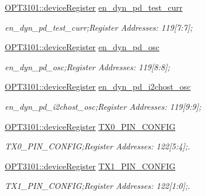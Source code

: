 \begin{DoxyCompactItemize}
\mbox{\hyperlink{class_o_p_t3101_1_1device_register}{O\+P\+T3101\+::device\+Register}} \mbox{\hyperlink{class_o_p_t3101_1_1registers_a1dd4f120fd54b75ee11b2749c9572fc7}{en\+\_\+dyn\+\_\+pd\+\_\+test\+\_\+curr}}
\begin{DoxyCompactList}\small\item\em en\+\_\+dyn\+\_\+pd\+\_\+test\+\_\+curr;Register Addresses\+: 119\mbox{[}7\+:7\mbox{]}; \end{DoxyCompactList}\item 
\mbox{\hyperlink{class_o_p_t3101_1_1device_register}{O\+P\+T3101\+::device\+Register}} \mbox{\hyperlink{class_o_p_t3101_1_1registers_a531bbd358fefe3feca48a12938b7ef11}{en\+\_\+dyn\+\_\+pd\+\_\+osc}}
\begin{DoxyCompactList}\small\item\em en\+\_\+dyn\+\_\+pd\+\_\+osc;Register Addresses\+: 119\mbox{[}8\+:8\mbox{]}; \end{DoxyCompactList}\item 
\mbox{\hyperlink{class_o_p_t3101_1_1device_register}{O\+P\+T3101\+::device\+Register}} \mbox{\hyperlink{class_o_p_t3101_1_1registers_ac3f0387e577070854f43aa27e5b86020}{en\+\_\+dyn\+\_\+pd\+\_\+i2chost\+\_\+osc}}
\begin{DoxyCompactList}\small\item\em en\+\_\+dyn\+\_\+pd\+\_\+i2chost\+\_\+osc;Register Addresses\+: 119\mbox{[}9\+:9\mbox{]}; \end{DoxyCompactList}\item 
\mbox{\hyperlink{class_o_p_t3101_1_1device_register}{O\+P\+T3101\+::device\+Register}} \mbox{\hyperlink{class_o_p_t3101_1_1registers_a8621153128a560a191346df43fa28c3c}{T\+X0\+\_\+\+P\+I\+N\+\_\+\+C\+O\+N\+F\+IG}}
\begin{DoxyCompactList}\small\item\em T\+X0\+\_\+\+P\+I\+N\+\_\+\+C\+O\+N\+F\+IG;Register Addresses\+: 122\mbox{[}5\+:4\mbox{]};. \end{DoxyCompactList}\item 
\mbox{\hyperlink{class_o_p_t3101_1_1device_register}{O\+P\+T3101\+::device\+Register}} \mbox{\hyperlink{class_o_p_t3101_1_1registers_aacb755066f8b0cf7969d733c61b1cb68}{T\+X1\+\_\+\+P\+I\+N\+\_\+\+C\+O\+N\+F\+IG}}
\begin{DoxyCompactList}\small\item\em T\+X1\+\_\+\+P\+I\+N\+\_\+\+C\+O\+N\+F\+IG;Register Addresses\+: 122\mbox{[}1\+:0\mbox{]};. \end{DoxyCompactList}\item 

\end{DoxyCompactItemize}
